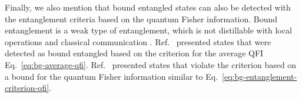 Finally, we also mention that bound entangled states can also be detected with the entanglement criteria based on the quantum Fisher information.
Bound entanglement is a weak type of entanglement, which is not distillable with local operations and classical communication \cite{Horodecki2009, Guehne2009}.
Ref.~\cite{Hyllus2012} presented states that were detected as bound entangled based on the criterion for the average QFI Eq.~\eqref{eq:bg-average-qfi}.
Ref.~\cite{Czekaj2015} presented states that violate the criterion based on a bound for the quantum Fisher information similar to Eq.~\eqref{eq:bg-entanglement-criterion-qfi}.
